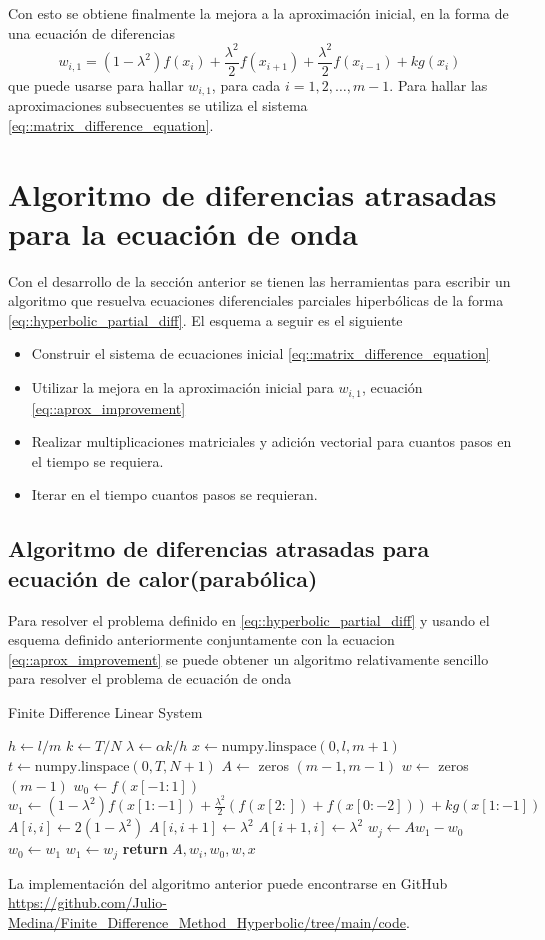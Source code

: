 \documentclass[a4paper]{article}
\begin{document}
Con esto se obtiene finalmente la mejora a la aproximación inicial, en la forma de una ecuación de diferencias
\begin{equation}\label{eq::aprox_improvement}
w_{i,1}=(1-\lambda^2)f(x_i)+\frac{\lambda^2}{2}f(x_{i+1})+\frac{\lambda^2}{2}f(x_{i-1})+kg(x_i)
\end{equation}
que puede usarse para hallar $w_{i,1}$, para cada $i=1,2,\hdots, m-1$. Para hallar las aproximaciones subsecuentes se utiliza el sistema \ref{eq::matrix_difference_equation}.

\section{Algoritmo de diferencias atrasadas para la ecuación de onda}
Con el desarrollo de la sección anterior se tienen las herramientas para escribir un algoritmo que resuelva ecuaciones diferenciales parciales hiperbólicas de la forma \ref{eq::hyperbolic_partial_diff}. El esquema a seguir es el siguiente
\begin{itemize}
\item Construir el sistema de ecuaciones inicial \ref{eq::matrix_difference_equation}
\item Utilizar la mejora en la aproximación inicial para $w_{i,1}$, ecuación \ref{eq::aprox_improvement}
\item Realizar multiplicaciones matriciales y adición vectorial para cuantos pasos en el tiempo se requiera.
\item Iterar en el tiempo cuantos pasos se requieran.
\end{itemize}
\subsection{Algoritmo de diferencias atrasadas para ecuación de calor(parabólica)}
Para resolver el problema definido en \ref{eq::hyperbolic_partial_diff} y usando el esquema definido anteriormente conjuntamente con la ecuacion \ref{eq::aprox_improvement} se puede obtener un algoritmo relativamente sencillo para resolver el problema de ecuación de onda
\begin{algorithm}[H]
\caption{Finite Difference Linear System}\label{alg::fininte_difference_hyperbolic}
\begin{algorithmic}[H]
\State $h \gets l/m$
\State $k \gets T/N$
\State $\lambda \gets \alpha k /h$
\State $x\gets \text{numpy.linspace}(0, l, m+1)$
\State $t \gets \text{numpy.linspace}(0, T, N+1)$
\State $A \gets$ zeros $(m-1,m-1)$
\State $w \gets$ zeros $(m-1)$
\State $w_0\gets f(x[-1:1])$
\State $w_1 \gets (1-\lambda^2)f(x[1:-1])+\frac{\lambda^2}{2}(f(x[2:])+f(x[0:-2]))+kg(x[1:-1])$
\State $A[i,i]\gets 2(1-\lambda^2)$
\State $A[i,i+1]\gets \lambda^2$
\State $A[i+1,i]\gets\lambda^2$
\EndIf
\EndFor
{}
\State $w_j\gets A w_1-w_0$
\State $w_0\gets w_1$
\State $w_1\gets w_j$
\EndFor
\State \textbf{return} $A, w_i,w_0,w,x$
\EndFunction
\end{algorithmic}
\end{algorithm}
La implementación del algoritmo anterior puede encontrarse en GitHub \url{https://github.com/Julio-Medina/Finite_Difference_Method_Hyperbolic/tree/main/code}.
\end{document}
